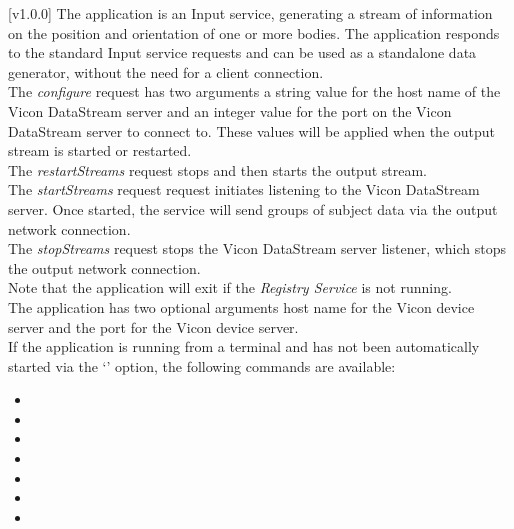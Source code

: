 [v1.0.0]
The  application is an Input service,
generating a stream of information on the position and orientation of one or more bodies.
The application responds to the standard Input service requests and can be used as a
standalone data generator, without the need for a client connection.\\

The \emph{configure} request has two arguments \longDash{} a string value for the host
name of the Vicon DataStream server and an integer value for the port on the Vicon
DataStream server to connect to.
These values will be applied when the output stream is started or restarted.\\ 

The \emph{restartStreams} request stops and then starts the output stream.\\

The \emph{startStreams} request request initiates listening to the Vicon DataStream
server.
Once started, the service will send groups of subject data via the output \yarp{} network
connection.\\

The \emph{stopStreams} request stops the Vicon DataStream server listener, which stops the
output \yarp{} network connection.\\ 

Note that the application will exit if the \emph{Registry Service} is not running.\\

The application has two optional arguments \longDash{} host name for the Vicon device
server and the port for the Vicon device server.
\insertAppParameters{}
\insertTagDescription{\VDSI}
\insertInputServiceComment{}\\

If the application is running from a terminal and has not been automatically started via
the `' option, the following commands are available:
\begin{itemize}
\item{}
\item\exSp{}
\item\exSp{}
\item\exSp{}
\item\exSp{}
\item\exSp{}
\item\exSp{}
\end{itemize}
\primaryEnd{}
